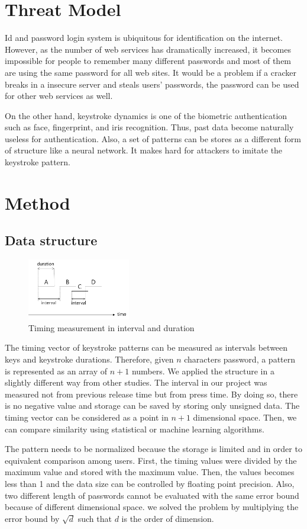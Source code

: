 \documentclass[twocolumn,showpacs,%
  nofootinbib,aps,%
  eqsecnum,prd,notitlepage,showkeys,10pt]{revtex4-1}
\begin{document}
\section{Threat Model}
Id and password login system is ubiquitous for identification on the internet. However, as the number of web services has dramatically increased, it becomes impossible for people to remember many different passwords and most of them are using the same password for all web sites. It would be a problem if a cracker breaks in a insecure server and steals users' passwords, the password can be used for other web services as well.
\par
On the other hand, keystroke dynamics is one of the biometric authentication such as face, fingerprint, and iris recognition\cite{karnan2011biometric}. Thus, past data become naturally useless for authentication. Also, a set of patterns can be stores as a different form of structure like a neural network. It makes hard for attackers to imitate the keystroke pattern.

\section{Method}
\subsection{Data structure}
\begin{figure}[h]
  \centering
  \includegraphics[width=0.4\textwidth]{keystroke}
  \caption{Timing measurement in interval and duration}
  \label{fig:keystroke}
\end{figure}

The timing vector of keystroke patterns can be measured as intervals between keys and keystroke durations\cite{cho2000web}. Therefore, given $n$ characters password, a pattern is represented as an array of $n+1$ numbers. We applied the structure in a slightly different way from other studies. The interval in our project was measured not from previous release time but from press time. By doing so, there is no negative value and storage can be saved by storing only unsigned data. The timing vector can be considered as a point in $n+1$ dimensional space. Then, we can compare similarity using statistical or machine learning algorithms.
\par
The pattern needs to be normalized because the storage is limited and in order to equivalent comparison among users. First, the timing values were divided by the maximum value and stored with the maximum value. Then, the values becomes less than 1 and the data size can be controlled by floating point precision. Also, two different length of passwords cannot be evaluated with the same error bound because of different dimensional space. we solved the problem by multiplying the error bound by $\sqrt{d}$ such that $d$ is the order of dimension.
\end{document}
